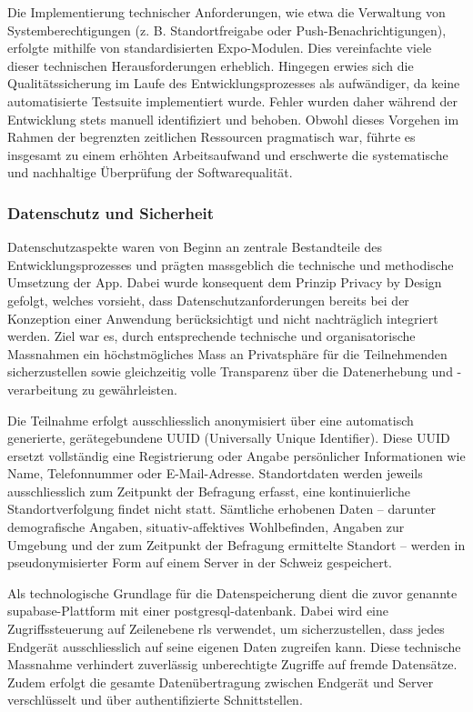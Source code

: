 Die Implementierung technischer Anforderungen, wie etwa die Verwaltung von Systemberechtigungen (z. B. Standortfreigabe oder Push-Benachrichtigungen), erfolgte mithilfe von standardisierten Expo-Modulen. Dies vereinfachte viele dieser technischen Herausforderungen erheblich. Hingegen erwies sich die Qualitätssicherung im Laufe des Entwicklungsprozesses als aufwändiger, da keine automatisierte Testsuite implementiert wurde. Fehler wurden daher während der Entwicklung stets manuell identifiziert und behoben. Obwohl dieses Vorgehen im Rahmen der begrenzten zeitlichen Ressourcen pragmatisch war, führte es insgesamt zu einem erhöhten Arbeitsaufwand und erschwerte die systematische und nachhaltige Überprüfung der Softwarequalität.

\subsubsection{Datenschutz und Sicherheit}
Datenschutzaspekte waren von Beginn an zentrale Bestandteile des Entwicklungsprozesses und prägten massgeblich die technische und methodische Umsetzung der App. Dabei wurde konsequent dem Prinzip Privacy by Design gefolgt, welches vorsieht, dass Datenschutzanforderungen bereits bei der Konzeption einer Anwendung berücksichtigt und nicht nachträglich integriert werden. Ziel war es, durch entsprechende technische und organisatorische Massnahmen ein höchstmögliches Mass an Privatsphäre für die Teilnehmenden sicherzustellen sowie gleichzeitig volle Transparenz über die Datenerhebung und -verarbeitung zu gewährleisten.

Die Teilnahme erfolgt ausschliesslich anonymisiert über eine automatisch generierte, gerätegebundene UUID (Universally Unique Identifier). Diese UUID ersetzt vollständig eine Registrierung oder Angabe persönlicher Informationen wie Name, Telefonnummer oder E-Mail-Adresse. Standortdaten werden jeweils ausschliesslich zum Zeitpunkt der Befragung erfasst, eine kontinuierliche Standortverfolgung findet nicht statt. Sämtliche erhobenen Daten – darunter demografische Angaben, situativ-affektives Wohlbefinden, Angaben zur Umgebung und der zum Zeitpunkt der Befragung ermittelte Standort – werden in pseudonymisierter Form auf einem Server in der Schweiz gespeichert.

Als technologische Grundlage für die Datenspeicherung dient die zuvor genannte \gls{supabase}-Plattform mit einer \gls{postgresql}-\gls{datenbank}. Dabei wird eine Zugriffssteuerung auf Zeilenebene \gls{rls} verwendet, um sicherzustellen, dass jedes Endgerät ausschliesslich auf seine eigenen Daten zugreifen kann. Diese technische Massnahme verhindert zuverlässig unberechtigte Zugriffe auf fremde Datensätze. Zudem erfolgt die gesamte Datenübertragung zwischen Endgerät und Server verschlüsselt und über authentifizierte Schnittstellen.


